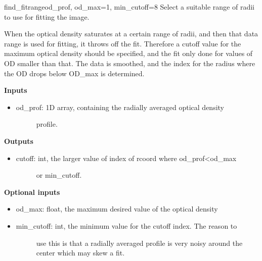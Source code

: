 \documentclass[letterpaper,10pt,english]{manual}
\begin{document}
\hypertarget{imageprocess.find_fitrange}{}\begin{funcdesc}{find\_fitrange}{od\_prof, od\_max=1, min\_cutoff=8}
Select a suitable range of radii to use for fitting the image.

When the optical density saturates at a certain range of radii, and then
that data range is used for fitting, it throws off the fit. Therefore
a cutoff value for the maximum optical density should be specified, and the
fit only done for values of OD smaller than that. The data is smoothed,
and the index for the radius where the OD drops below OD\_max is determined.

\textbf{Inputs}
\begin{itemize}
\item {} \begin{description}
\item[od\_prof: 1D array, containing the radially averaged optical density]
profile.

\end{description}

\end{itemize}

\textbf{Outputs}
\begin{itemize}
\item {} \begin{description}
\item[cutoff: int, the larger value of index of rcoord where od\_prof\textless{}od\_max]
or min\_cutoff.

\end{description}

\end{itemize}

\textbf{Optional inputs}
\begin{itemize}
\item {} 
od\_max: float, the maximum desired value of the optical density

\item {} \begin{description}
\item[min\_cutoff: int, the minimum value for the cutoff index. The reason to]
use this is that a radially averaged profile is very noisy
around the center which may skew a fit.

\end{description}

\end{itemize}
\end{funcdesc}
\end{document}
